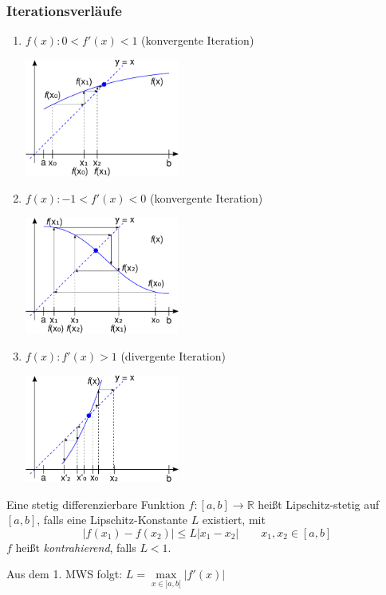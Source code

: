 \subsubsection*{Iterationsverläufe}
\begin{enumerate}
	\item $f(x) : 0 < f'(x) < 1$ (konvergente Iteration)
	\begin{center}
		\includegraphics[width=0.4\textwidth]{include/20091215-1.pdf}
	\end{center}
	\item $f(x) : -1 < f'(x) < 0$ (konvergente Iteration)
	\begin{center}
		\includegraphics[width=0.4\textwidth]{include/20091215-2.pdf}
	\end{center}
	\item $f(x) : f'(x) > 1$ (divergente Iteration)
	\begin{center}
		\includegraphics[width=0.4\textwidth]{include/20091215-3.pdf}
	\end{center}
\end{enumerate}

\begin{definition}
	Eine stetig differenzierbare Funktion $f: [a, b] \rightarrow \mathbb{R}$ heißt Lipschitz-stetig auf $[a, b]$, falls eine Lipschitz-Konstante $L$ existiert, mit
	\begin{equation*}
		|f(x_1) - f(x_2)| \leq L |x_1 - x_2| \qquad x_1, x_2 \in [a, b]
	\end{equation*}
	$f$ heißt \emph{kontrahierend}, falls $L < 1$.
\end{definition}
\begin{note}
	Aus dem 1. MWS folgt: $L = \underset{x \in ]a, b[}{\max} |f'(x)|$
\end{note}

